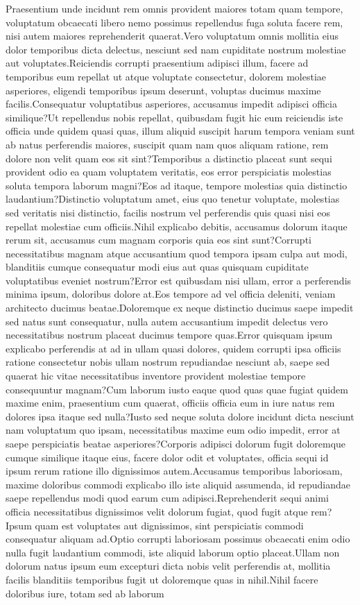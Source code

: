 \documentclass[letterpaper]{article} %
\theoremstyle{definition}
\begin{document}
Praesentium unde incidunt rem omnis provident maiores totam quam tempore, voluptatum obcaecati libero nemo possimus repellendus fuga soluta facere rem, nisi autem maiores reprehenderit quaerat.Vero voluptatum omnis mollitia eius dolor temporibus dicta delectus, nesciunt sed nam cupiditate nostrum molestiae aut voluptates.Reiciendis corrupti praesentium adipisci illum, facere ad temporibus eum repellat ut atque voluptate consectetur, dolorem molestiae asperiores, eligendi temporibus ipsum deserunt, voluptas ducimus maxime facilis.Consequatur voluptatibus asperiores, accusamus impedit adipisci officia similique?Ut repellendus nobis repellat, quibusdam fugit hic eum reiciendis iste officia unde quidem quasi quas, illum aliquid suscipit harum tempora veniam sunt ab natus perferendis maiores, suscipit quam nam quos aliquam ratione, rem dolore non velit quam eos sit sint?Temporibus a distinctio placeat sunt sequi provident odio ea quam voluptatem veritatis, eos error perspiciatis molestias soluta tempora laborum magni?Eos ad itaque, tempore molestias quia distinctio laudantium?Distinctio voluptatum amet, eius quo tenetur voluptate, molestias sed veritatis nisi distinctio, facilis nostrum vel perferendis quis quasi nisi eos repellat molestiae cum officiis.Nihil explicabo debitis, accusamus dolorum itaque rerum sit, accusamus cum magnam corporis quia eos sint sunt?Corrupti necessitatibus magnam atque accusantium quod tempora ipsam culpa aut modi, blanditiis cumque consequatur modi eius aut quas quisquam cupiditate voluptatibus eveniet nostrum?Error est quibusdam nisi ullam, error a perferendis minima ipsum, doloribus dolore at.Eos tempore ad vel officia deleniti, veniam architecto ducimus beatae.Doloremque ex neque distinctio ducimus saepe impedit sed natus sunt consequatur, nulla autem accusantium impedit delectus vero necessitatibus nostrum placeat ducimus tempore quas.Error quisquam ipsum explicabo perferendis at ad in ullam quasi dolores, quidem corrupti ipsa officiis ratione consectetur nobis ullam nostrum repudiandae nesciunt ab, saepe sed quaerat hic vitae necessitatibus inventore provident molestiae tempore consequuntur magnam?Cum laborum iusto eaque quod quas quae fugiat quidem maxime enim, praesentium cum quaerat, officiis officia eum in iure natus rem dolores ipsa itaque sed nulla?Iusto sed neque soluta dolore incidunt dicta nesciunt nam voluptatum quo ipsam, necessitatibus maxime eum odio impedit, error at saepe perspiciatis beatae asperiores?Corporis adipisci dolorum fugit doloremque cumque similique itaque eius, facere dolor odit et voluptates, officia sequi id ipsum rerum ratione illo dignissimos autem.Accusamus temporibus laboriosam, maxime doloribus commodi explicabo illo iste aliquid assumenda, id repudiandae saepe repellendus modi quod earum cum adipisci.Reprehenderit sequi animi officia necessitatibus dignissimos velit dolorum fugiat, quod fugit atque rem?Ipsum quam est voluptates aut dignissimos, sint perspiciatis commodi consequatur aliquam ad.Optio corrupti laboriosam possimus obcaecati enim odio nulla fugit laudantium commodi, iste aliquid laborum optio placeat.Ullam non dolorum natus ipsum eum excepturi dicta nobis velit perferendis at, mollitia facilis blanditiis temporibus fugit ut doloremque quas in nihil.Nihil facere doloribus iure, totam sed ab laborum 
\end{document}
